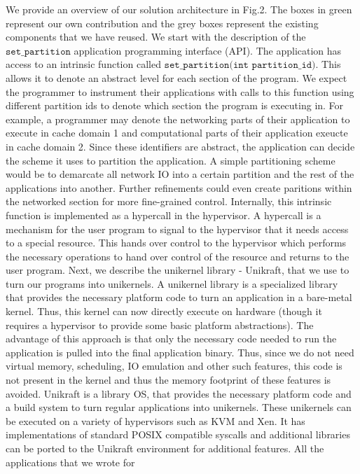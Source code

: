 \documentclass[sigconf,authorversion,noacm]{acmart}
\begin{document}
We provide an overview of our solution architecture in Fig.2. The boxes in green
represent our own contribution and the grey boxes represent the existing
components that we have reused. We start with the description of the
$\texttt{set\_partition}$ application programming interface (API). The
application has access to an intrinsic function called
$\texttt{set\_partition(int partition\_id)}$. This allows it to denote an
abstract level for each section of the program. We expect the programmer to
instrument their applications with calls to this function using different
partition ids to denote which section the program is executing in. For example,
a programmer may denote the networking parts of their application to execute in
cache domain 1 and computational parts of their application exeucte in cache
domain 2. Since these identifiers are abstract, the application can decide the
scheme it uses to partition the application. A simple partitioning scheme would
be to demarcate all network IO into a certain partition and the rest of the
applications into another. Further refinements could even create paritions
within the networked section for more fine-grained control. Internally, this
intrinsic function is implemented as a hypercall in the hypervisor. A hypercall
is a mechanism for the user program to signal to the hypervisor that it needs
access to a special resource. This hands over control to the hypervisor which
performs the necessary operations to hand over control of the resource and
returns to the user program. Next, we describe the unikernel library - Unikraft,
that we use to turn our programs into unikernels. A unikernel library is a
specialized library that provides the necessary platform code to turn an
application in a bare-metal kernel. Thus, this kernel can now directly execute
on hardware (though it requires a hypervisor to provide some basic platform
abstractions). The advantage of this approach is that only the necessary code
needed to run the application is pulled into the final application binary. Thus,
since we do not need virtual memory, scheduling, IO emulation and other such
features, this code is not present in the kernel and thus the memory footprint
of these features is avoided. Unikraft \cite{unikraft} is a library OS, that
provides the necessary platform code and a build system to turn regular
applications into unikernels. These unikernels can be executed on a variety of
hypervisors such as KVM and Xen. It has implementations of standard POSIX
compatible syscalls and additional libraries can be ported to the Unikraft
environment for additional features. All the applications that we wrote for
\end{document}
